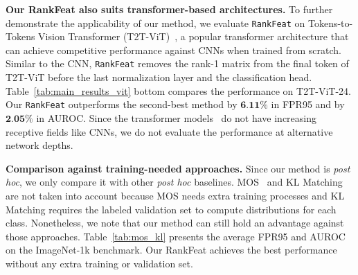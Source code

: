 \noindent \textbf{Our RankFeat also suits transformer-based architectures.} To further demonstrate the applicability of our method, we evaluate \texttt{RankFeat} on Tokens-to-Tokens Vision Transformer (T2T-ViT)~\cite{yuan2021tokens}, a popular transformer architecture that can achieve competitive performance against CNNs when trained from scratch. Similar to the CNN, \texttt{RankFeat} removes the rank-1 matrix from the final token of T2T-ViT before the last normalization layer and the classification head. Table~\ref{tab:main_results_vit} bottom compares the performance on T2T-ViT-24. Our \texttt{RankFeat} outperforms the second-best method by $\textbf{6.11\%}$ in FPR95 and by $\textbf{2.05\%}$ in AUROC. Since the transformer models~\cite{dosovitskiy2020image,yuan2021tokens} do not have increasing receptive fields like CNNs, we do not evaluate the performance at alternative network depths. 


\noindent \textbf{Comparison against training-needed approaches.} Since our method is \emph{post hoc}, we only compare it with other \emph{post hoc} baselines. MOS~\cite{huang2021mos} and KL Matching~\cite{hendrycks2019scaling} are not taken into account because MOS needs extra training processes and KL Matching requires the labeled validation set to compute distributions for each class. Nonetheless, we note that our method can still hold an advantage against those approaches. Table~\ref{tab:mos_kl} presents the average FPR95 and AUROC on the ImageNet-1k benchmark. Our RankFeat achieves the best performance without any extra training or validation set.

\begin{table}[htbp]
    \centering
    \caption{Comparison against training-needed methods on ImageNet-1k based on ResNetv2-101~\cite{he2016identity}.}
    \label{tab:mos_kl}
\end{table}

